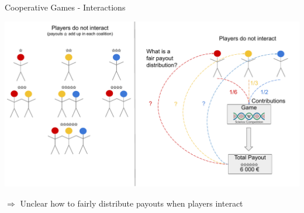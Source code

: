 \documentclass[11pt,compress,t,notes=noshow, aspectratio=169, xcolor=table]{beamer}
\begin{document}



\begin{frame}{Cooperative Games - Interactions}
\begin{center}
\includegraphics[page=3, width = \textwidth]{figure/Shapley.pdf}

$\Rightarrow$ Unclear how to fairly distribute payouts when players interact
\end{center}
\end{frame}
\end{document}
